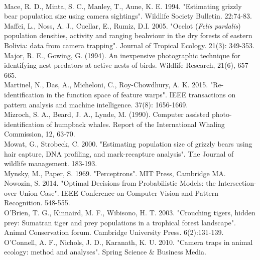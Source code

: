 \documentclass[11pt]{article}
\begin{document}
\newline
\\
Mace, R. D., Minta, S. C., Manley, T., Aune, K. E. 1994. "Estimating grizzly bear population size using camera sightings". Wildlife Society Bulletin. 22:74-83.
\newline
\\
Maffei, L., Noss, A. J., Cuellar, E., Rumiz, D.I. 2005. "Ocelot (\textit{Felis pardalis}) population densities, activity and ranging beahviour in the dry forests of eastern Bolivia: data from camera trapping". Journal of Tropical Ecology. 21(3): 349-353.
\newline
\\
Major, R. E., Gowing, G. (1994). An inexpensive photographic technique for identifying nest predators at active nests of birds. Wildlife Research, 21(6), 657-665.
\newline
\\
Martinel, N., Das, A., Micheloni, C., Roy-Chowdhury, A. K. 2015. "Re-identification in the function space of feature warps". IEEE transactions on pattern analysis and machine intelligence. 37(8): 1656-1669.
\newline
\\
Mizroch, S. A., Beard, J. A., Lynde, M. (1990). Computer assisted photo-identification of humpback whales. Report of the International Whaling Commission, 12, 63-70.
\newline
\\
Mowat, G., Strobeck, C. 2000. "Estimating population size of grizzly bears using hair capture, DNA profiling, and mark-recapture analysis". The Journal of wildlife management. 183-193.
\newline
\\
Mynsky, M., Paper, S. 1969. "Perceptrons". MIT Press, Cambridge MA.
\newline
\\
Nowozin, S. 2014. "Optimal Decisions from Probabilistic Models: the Intersection-over-Union Case". IEEE Conference on Computer Vision and Pattern Recognition. 548-555.
\newline
\\
O'Brien, T. G., Kinnaird, M. F., Wibisono, H. T. 2003. "Crouching tigers, hidden prey: Sumatran tiger and prey populations in a trophical forest landscape". Animal Conservation forum. Cambridge University Press. 6(2):131-139.
\newline
\\
O'Connell, A. F., Nichols, J. D., Karanath, K. U. 2010. "Camera traps in animal ecology: method and analyses". Spring Science \& Business Media.
\end{document}
